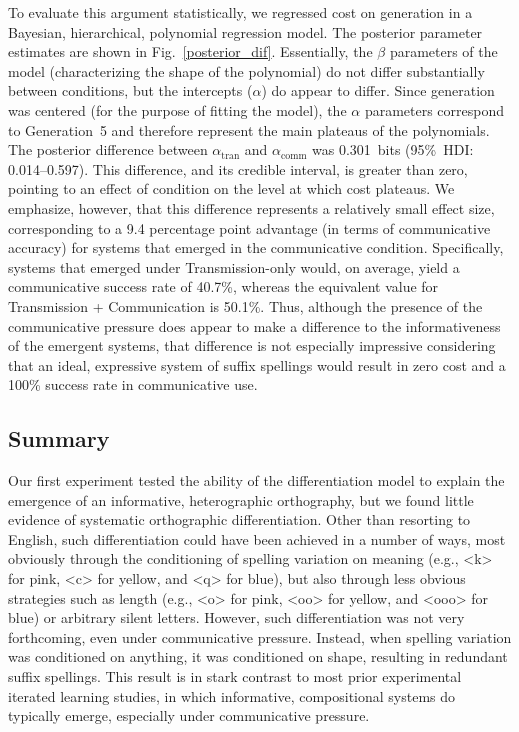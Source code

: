 \documentclass[doc,biblatex]{apa7}
\begin{document}
To evaluate this argument statistically, we regressed cost on generation in a Bayesian, hierarchical, polynomial regression model. The posterior parameter estimates are shown in Fig.~\ref{posterior_dif}. Essentially, the $\beta$ parameters of the model (characterizing the shape of the polynomial) do not differ substantially between conditions, but the intercepts ($\alpha$) do appear to differ. Since generation was centered (for the purpose of fitting the model), the $\alpha$ parameters correspond to Generation~5 and therefore represent the main plateaus of the polynomials. The posterior difference between $\alpha_\mathrm{tran}$ and $\alpha_\mathrm{comm}$ was 0.301~bits (95\%~HDI: 0.014--0.597). This difference, and its credible interval, is greater than zero, pointing to an effect of condition on the level at which cost plateaus. We emphasize, however, that this difference represents a relatively small effect size, corresponding to a 9.4 percentage point advantage (in terms of communicative accuracy) for systems that emerged in the communicative condition. Specifically, systems that emerged under Transmission-only would, on average, yield a communicative success rate of 40.7\%, whereas the equivalent value for Transmission + Communication is 50.1\%. Thus, although the presence of the communicative pressure does appear to make a difference to the informativeness of the emergent systems, that difference is not especially impressive considering that an ideal, expressive system of suffix spellings would result in zero cost and a 100\% success rate in communicative use.

\subsection{Summary}

Our first experiment tested the ability of the differentiation model to explain the emergence of an informative, heterographic orthography, but we found little evidence of systematic orthographic differentiation. Other than resorting to English, such differentiation could have been achieved in a number of ways, most obviously through the conditioning of spelling variation on meaning (e.g., <k> for pink, <c> for yellow, and <q> for blue), but also through less obvious strategies such as length (e.g., <o> for pink, <oo> for yellow, and <ooo> for blue) or arbitrary silent letters. However, such differentiation was not very forthcoming, even under communicative pressure. Instead, when spelling variation was conditioned on anything, it was conditioned on shape, resulting in redundant suffix spellings. This result is in stark contrast to most prior experimental iterated learning studies, in which informative, compositional systems do typically emerge, especially under communicative pressure.
\end{document}

